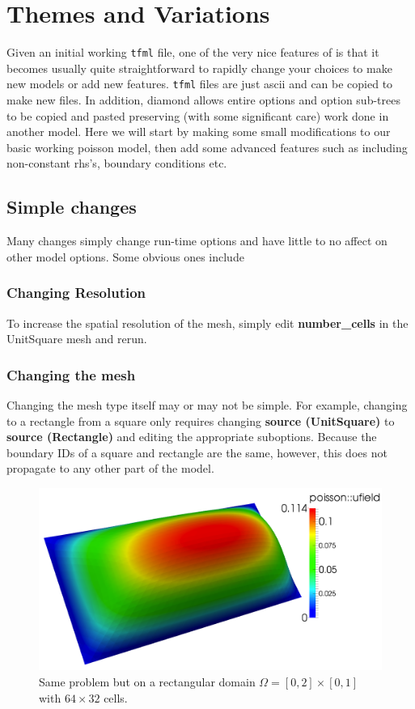 



\section{Themes and Variations}

Given an initial working \texttt{tfml} file, one of the very nice
features of \TF{} is that it becomes usually quite straightforward to
rapidly change your choices to make new models or add new features.
\texttt{tfml} files are just ascii and can be copied to make new
files. In addition,  diamond allows entire options and option
sub-trees to be copied and pasted preserving (with some significant
care) work done in another model.  Here we will start by making some
small modifications to our basic working poisson model, then add some
advanced features such as including non-constant rhs's, boundary
conditions etc.

\subsection{Simple changes}
\label{sec:simple-changes}

Many changes simply change run-time options and have little to no
affect on other model options.  Some obvious ones include
\subsubsection{Changing Resolution}
\label{sec:changing-elements}

To increase the spatial resolution of the mesh, simply edit
\textbf{number\_cells} in the UnitSquare mesh and rerun.

\subsubsection{Changing the mesh}
\label{sec:changing-mesh}

Changing the mesh type itself may or may not be simple.  For example, changing to a rectangle
from a square only requires changing \textbf{source (UnitSquare)} to
\textbf{source (Rectangle)} and editing the appropriate
suboptions. Because the boundary IDs of a square and rectangle are
the same, however, this does not propagate to any other part of the
model. 
\begin{figure}[h!]
  \centering
\includegraphics[width=.7\textwidth]{figures/poisson_simple_rectangle}
  \caption{\small Same problem but on a rectangular domain
    $\Omega=[0,2]\times[0,1]$ with $64\times32$ cells.}
\label{fig:poisson_rectangle}
\end{figure}

